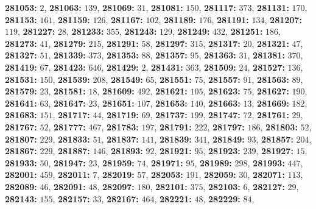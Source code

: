 \textsf{\bfseries 281053:} $2$, \textsf{\bfseries 281063:} $139$, \textsf{\bfseries 281069:} $31$, \textsf{\bfseries 281081:} $150$, \textsf{\bfseries 281117:} $373$, \textsf{\bfseries 281131:} $170$, \textsf{\bfseries 281153:} $161$, \textsf{\bfseries 281159:} $126$, \textsf{\bfseries 281167:} $102$, \textsf{\bfseries 281189:} $176$, \textsf{\bfseries 281191:} $134$, \textsf{\bfseries 281207:} $119$, \textsf{\bfseries 281227:} $28$, \textsf{\bfseries 281233:} $355$, \textsf{\bfseries 281243:} $129$, \textsf{\bfseries 281249:} $432$, \textsf{\bfseries 281251:} $186$, \textsf{\bfseries 281273:} $41$, \textsf{\bfseries 281279:} $215$, \textsf{\bfseries 281291:} $58$, \textsf{\bfseries 281297:} $315$, \textsf{\bfseries 281317:} $20$, \textsf{\bfseries 281321:} $47$, \textsf{\bfseries 281327:} $51$, \textsf{\bfseries 281339:} $373$, \textsf{\bfseries 281353:} $88$, \textsf{\bfseries 281357:} $95$, \textsf{\bfseries 281363:} $31$, \textsf{\bfseries 281381:} $370$, \textsf{\bfseries 281419:} $67$, \textsf{\bfseries 281423:} $646$, \textsf{\bfseries 281429:} $2$, \textsf{\bfseries 281431:} $363$, \textsf{\bfseries 281509:} $24$, \textsf{\bfseries 281527:} $136$, \textsf{\bfseries 281531:} $150$, \textsf{\bfseries 281539:} $208$, \textsf{\bfseries 281549:} $65$, \textsf{\bfseries 281551:} $75$, \textsf{\bfseries 281557:} $91$, \textsf{\bfseries 281563:} $89$, \textsf{\bfseries 281579:} $23$, \textsf{\bfseries 281581:} $18$, \textsf{\bfseries 281609:} $492$, \textsf{\bfseries 281621:} $105$, \textsf{\bfseries 281623:} $75$, \textsf{\bfseries 281627:} $190$, \textsf{\bfseries 281641:} $63$, \textsf{\bfseries 281647:} $23$, \textsf{\bfseries 281651:} $107$, \textsf{\bfseries 281653:} $140$, \textsf{\bfseries 281663:} $13$, \textsf{\bfseries 281669:} $182$, \textsf{\bfseries 281683:} $151$, \textsf{\bfseries 281717:} $44$, \textsf{\bfseries 281719:} $69$, \textsf{\bfseries 281737:} $199$, \textsf{\bfseries 281747:} $72$, \textsf{\bfseries 281761:} $29$, \textsf{\bfseries 281767:} $52$, \textsf{\bfseries 281777:} $467$, \textsf{\bfseries 281783:} $197$, \textsf{\bfseries 281791:} $222$, \textsf{\bfseries 281797:} $186$, \textsf{\bfseries 281803:} $52$, \textsf{\bfseries 281807:} $229$, \textsf{\bfseries 281833:} $51$, \textsf{\bfseries 281837:} $141$, \textsf{\bfseries 281839:} $341$, \textsf{\bfseries 281849:} $93$, \textsf{\bfseries 281857:} $204$, \textsf{\bfseries 281867:} $229$, \textsf{\bfseries 281887:} $146$, \textsf{\bfseries 281893:} $92$, \textsf{\bfseries 281921:} $95$, \textsf{\bfseries 281923:} $239$, \textsf{\bfseries 281927:} $15$, \textsf{\bfseries 281933:} $50$, \textsf{\bfseries 281947:} $23$, \textsf{\bfseries 281959:} $74$, \textsf{\bfseries 281971:} $95$, \textsf{\bfseries 281989:} $298$, \textsf{\bfseries 281993:} $447$, \textsf{\bfseries 282001:} $459$, \textsf{\bfseries 282011:} $7$, \textsf{\bfseries 282019:} $57$, \textsf{\bfseries 282053:} $191$, \textsf{\bfseries 282059:} $30$, \textsf{\bfseries 282071:} $113$, \textsf{\bfseries 282089:} $46$, \textsf{\bfseries 282091:} $48$, \textsf{\bfseries 282097:} $180$, \textsf{\bfseries 282101:} $375$, \textsf{\bfseries 282103:} $6$, \textsf{\bfseries 282127:} $29$, \textsf{\bfseries 282143:} $155$, \textsf{\bfseries 282157:} $33$, \textsf{\bfseries 282167:} $464$, \textsf{\bfseries 282221:} $48$, \textsf{\bfseries 282229:} $84$, 
